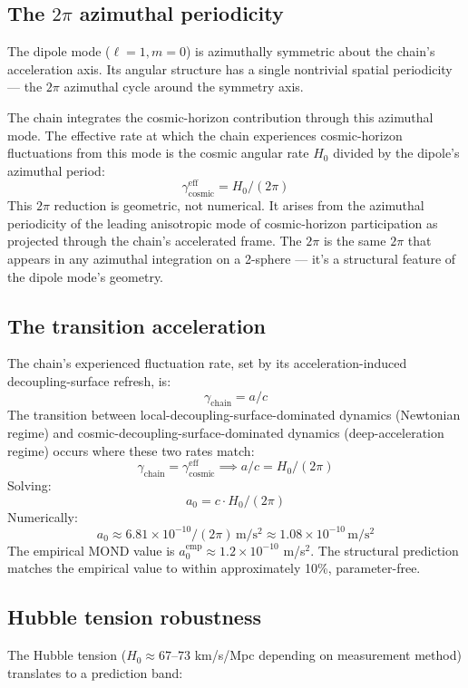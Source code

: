 \documentclass[11pt,a4paper]{article}
\begin{document}
\subsection{The $2\pi$ azimuthal periodicity}

The dipole mode ($\ell = 1, m = 0$) is azimuthally symmetric about the chain's acceleration axis. Its angular structure has a single nontrivial spatial periodicity --- the $2\pi$ azimuthal cycle around the symmetry axis.

The chain integrates the cosmic-horizon contribution through this azimuthal mode. The effective rate at which the chain experiences cosmic-horizon fluctuations from this mode is the cosmic angular rate $H_0$ divided by the dipole's azimuthal period:
\[
\gamma_{\mathrm{cosmic}}^{\mathrm{eff}} = H_{0} / (2\pi)
\]
This $2\pi$ reduction is geometric, not numerical. It arises from the azimuthal periodicity of the leading anisotropic mode of cosmic-horizon participation as projected through the chain's accelerated frame. The $2\pi$ is the same $2\pi$ that appears in any azimuthal integration on a 2-sphere --- it's a structural feature of the dipole mode's geometry.

\subsection{The transition acceleration}

The chain's experienced fluctuation rate, set by its acceleration-induced decoupling-surface refresh, is:
\[
\gamma_{\mathrm{chain}} = a / c
\]
The transition between local-decoupling-surface-dominated dynamics (Newtonian regime) and cosmic-decoupling-surface-dominated dynamics (deep-acceleration regime) occurs where these two rates match:
\[
\gamma_{\mathrm{chain}} = \gamma_{\mathrm{cosmic}}^{\mathrm{eff}} \implies a/c = H_{0} / (2\pi)
\]
Solving:
\[
a_{0} = c \cdot H_{0} / (2\pi)
\]
Numerically:
\[
a_{0} \approx 6.81 \times 10^{-10}/(2\pi)\, \mathrm{m/s^2} \approx 1.08 \times 10^{-10}\, \mathrm{m/s^2}
\]
The empirical MOND value is $a_0^{\mathrm{emp}} \approx 1.2 \times 10^{-10}$ m/s$^2$. The structural prediction matches the empirical value to within approximately 10\%, parameter-free.

\subsection{Hubble tension robustness}

The Hubble tension ($H_0 \approx 67$--$73$ km/s/Mpc depending on measurement method) translates to a prediction band:
\end{document}
